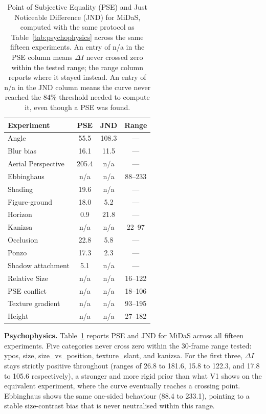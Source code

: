 \documentclass[10pt,twocolumn]{article}
\begin{document}
\begin{table}[h]
\centering
\caption{Point of Subjective Equality (PSE) and Just Noticeable Difference (JND) for
MiDaS, computed with the same protocol as Table~\ref{tab:psychophysics} across the same
fifteen experiments. An entry of n/a in the PSE column means $\Delta I$ never crossed
zero within the tested range; the range column reports where it stayed instead. An
entry of n/a in the JND column means the curve never reached the 84\% threshold needed
to compute it, even though a PSE was found.}
\label{tab:psychophysics_midas}
\small
\begin{tabular}{lccc}
\toprule
\textbf{Experiment} & \textbf{PSE} & \textbf{JND} & \textbf{Range} \\
\midrule
Angle              & 55.5 & 108.3 & --- \\
Blur bias          & 16.1 & 11.5  & --- \\
Aerial Perspective          & 205.4 & n/a  & --- \\
Ebbinghaus         & n/a  & n/a   & 88--233 \\
Shading       & 19.6 & n/a   & --- \\
Figure-ground      & 18.0 & 5.2   & --- \\
Horizon            & 0.9  & 21.8  & --- \\
Kanizsa            & n/a  & n/a   & 22--97 \\
Occlusion          & 22.8 & 5.8   & --- \\
Ponzo              & 17.3 & 2.3   & --- \\
Shadow attachment         & 5.1  & n/a   & --- \\
Relative Size               & n/a  & n/a   & 16--122 \\
PSE conflict & n/a  & n/a   & 18--106 \\
Texture gradient      & n/a  & n/a   & 93--195 \\
Height               & n/a  & n/a   & 27--182 \\
\bottomrule
\end{tabular}
\end{table}

\textbf{Psychophysics.} Table~\ref{tab:psychophysics_midas} reports PSE and JND for
MiDaS across all fifteen experiments. Five categories never cross zero within the
30-frame range tested: ypos, size, size\_vs\_position, texture\_slant, and kanizsa.
For the first three, $\Delta I$ stays strictly positive throughout (ranges of 26.8 to
181.6, 15.8 to 122.3, and 17.8 to 105.6 respectively), a stronger and more rigid prior
than what V1 shows on the equivalent experiment, where the curve eventually reaches a
crossing point. Ebbinghaus shows the same one-sided behaviour (88.4 to 233.1), pointing
to a stable size-contrast bias that is never neutralised within this range.
\end{document}
